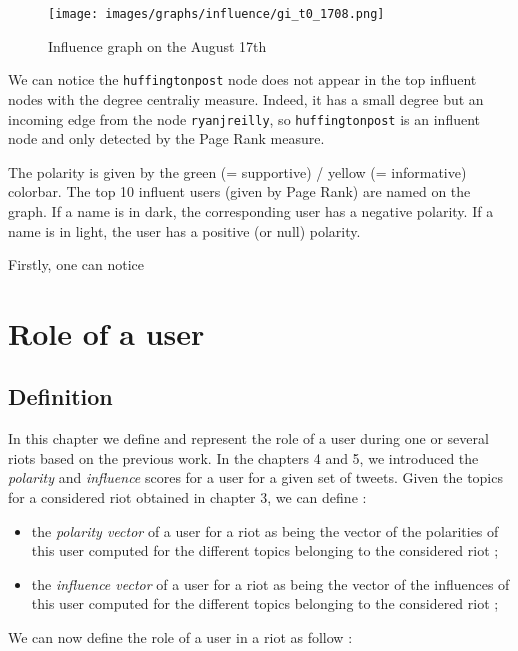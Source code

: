 \documentclass[a4paper,twoside,12pt,openright]{report}
\begin{document}
\vspace{1cm}

\begin{figure}[H]
\centering
\texttt{[image: images/graphs/influence/gi\_t0\_1708.png]}
\caption{Influence graph on the August 17th}
\label{gi17}
\end{figure}

\newpage

We can notice the \texttt{huffingtonpost} node does not appear in the top influent nodes with the degree centraliy measure. Indeed, it has a small degree but an incoming edge from the node \texttt{ryanjreilly}, so \texttt{huffingtonpost} is an influent node and only detected by the Page Rank measure.

The polarity is given by the green (= supportive) / yellow (= informative) colorbar. The top 10 influent users (given by Page Rank) are named on the graph. If a name is in dark, the corresponding user has a negative polarity. If a name is in light, the user has a positive (or null) polarity. 

Firstly, one can notice 


\chapter{Role of a user}

\section{Definition}
In this chapter we define and represent the role of a user during one or several riots based on the previous work. In the chapters 4 and 5, we introduced the \emph{polarity} and \emph{influence} scores for a user for a given set of tweets. Given the topics for a considered riot obtained in chapter 3, we can define :
\begin{itemize}
\item the \emph{polarity vector} of a user for a riot as being the vector of the polarities of this user computed for the different topics belonging to the considered riot ;
\item the \emph{influence vector} of a user for a riot as being the vector of the influences of this user computed for the different topics belonging to the considered riot ;
\end{itemize}
We can now define the role of a user in a riot as follow : 
\end{document}
